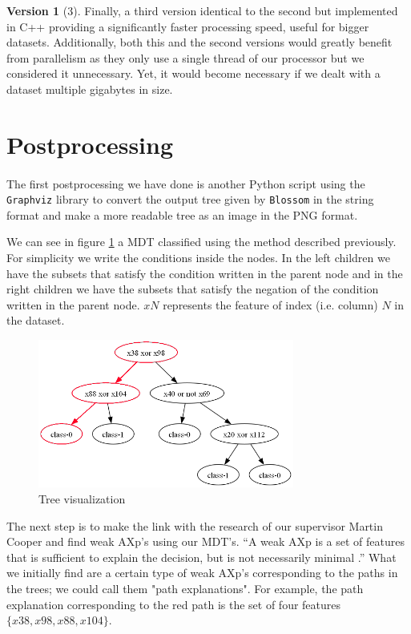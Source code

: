 \documentclass[12pt]{report}
\theoremstyle{definition}
\theoremstyle{definition}
\theoremstyle{definition}
\newtheorem*{version}{Version}
\begin{document}
\begin{version}[3] Finally, a third version identical to the second but implemented in C++ providing a significantly faster processing speed, useful for bigger datasets. Additionally, both this and the second versions would greatly benefit from parallelism as they only use a single thread of our processor but we considered it unnecessary. Yet, it would become necessary if we dealt with a dataset multiple gigabytes in size.
\end{version}


\newpage
\section{Postprocessing}
\paragraph{} The first postprocessing we have done is another Python script using the \texttt{Graphviz} library to convert the output tree given by \texttt{Blossom} in the string format and make a more readable tree as an image in the PNG format. 

We can see in figure \ref{fig:viz} a MDT classified using the method described previously. For simplicity we write the conditions inside the nodes. In the left children we have the subsets that satisfy the condition written in the parent node and in the right children we have the subsets that satisfy the negation of the condition written in the parent node. $xN$ represents the feature of index (i.e. column) $N$ in the dataset.

\begin{figure}[ht]
    \centering
    \includegraphics[width=0.75\textwidth]{example.png}
    \caption{Tree visualization}
    \label{fig:viz}
\end{figure}

The next step is to make the link with the research of our supervisor Martin Cooper and find weak AXp's using our MDT's. ``A weak AXp is a set of features that is sufficient to explain the decision, but is not necessarily minimal \cite{multivariate-explaining}.'' What we initially find are a certain type of weak AXp's corresponding to the paths in the trees; we could call them "path explanations". For example, the path explanation corresponding to the red path is the set of four features $\{x38, x98, x88, x104\}$. 
\end{document}
